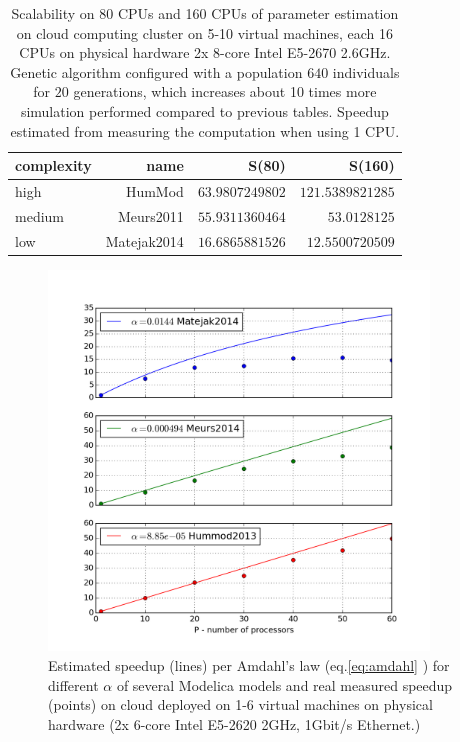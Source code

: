 \begin{table}[htb]
\footnotesize
\begin{tabular}{|l|r|r|r|}
\hline
complexity & name & S(80) & S(160)\\
\hline
high & HumMod \cite{Kofranek2011hummod} & $\num{63.9807249802}$ & $\num{121.5389821285}$ \\
medium & Meurs2011\cite{Meurs2011} & $\num{55.9311360464}$ & $\num{53.0128125}$ \\
low & Matejak2014\cite{Matejak2014sj} & $\num{16.6865881526}$ & $\num{12.5500720509}$\\ \hline
\end{tabular}
\caption{Scalability on 80 CPUs and 160 CPUs of parameter estimation on cloud computing cluster on 5-10 virtual machines, each 16 CPUs on physical hardware 2x 8-core Intel E5-2670 2.6GHz. Genetic algorithm configured with a population $640$ individuals for $20$ generations, which increases about 10 times more simulation performed compared to previous tables. Speedup estimated from measuring the computation when using 1 CPU.}
\label{table:speedupresult3}
\end{table}

\begin{figure}[htb]
    \centering
    \includegraphics[width=0.9\textwidth]{chapter7/speedup.png}
    \caption{Estimated speedup (lines) per Amdahl's law (eq.\ref{eq:amdahl} \cite{Amdahl1967}) for different $\alpha$ of several Modelica models and real measured speedup (points) on cloud deployed on 1-6 virtual machines on physical hardware (2x 6-core Intel E5-2620 2GHz, 1Gbit/s Ethernet.)  }
    \label{fig:amdahlres}
\end{figure}

